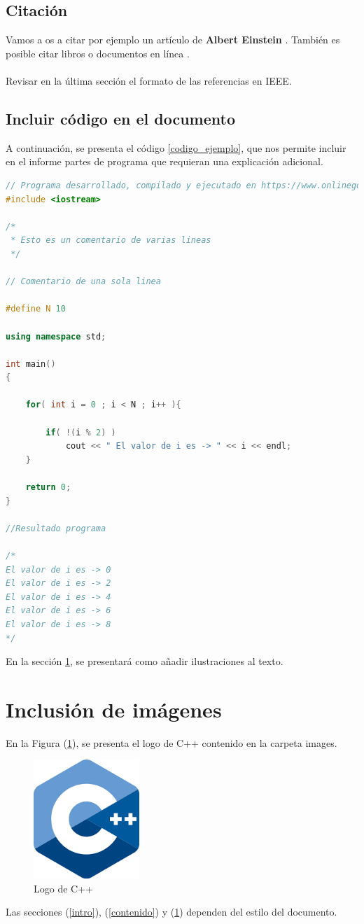 \documentclass{article}
\begin{document}
\subsection{Citación}
Vamos a os a citar por ejemplo un artículo de \textbf{Albert Einstein} \cite{einstein}.
También es posible citar libros \cite{dirac} o documentos en línea \cite{knuthwebsite}.\\\\
Revisar en la última sección el formato de las referencias en IEEE.

\subsection{Incluir código en el documento}
%
A continuación, se presenta el código \ref{codigo_ejemplo}, que nos permite incluir en el informe partes de programa que requieran una explicación adicional.
\begin{lstlisting}[language=C++, label=codigo_ejemplo]
// Programa desarrollado, compilado y ejecutado en https://www.onlinegdb.com
#include <iostream>

/*
 * Esto es un comentario de varias lineas
 */

// Comentario de una sola linea

#define N 10

using namespace std;

int main()
{
    
    for( int i = 0 ; i < N ; i++ ){
        
        if( !(i % 2) )
            cout << " El valor de i es -> " << i << endl;
    }
    
    return 0;
}

//Resultado programa

/*
El valor de i es -> 0
El valor de i es -> 2
El valor de i es -> 4
El valor de i es -> 6
El valor de i es -> 8
*/
\end{lstlisting}
En la sección \ref{imagenes}, se presentará como añadir ilustraciones al texto.


\section{Inclusión de imágenes} \label{imagenes}

En la Figura (\ref{fig:cpplogo}), se presenta el logo de C++ contenido en la carpeta images.

\begin{figure}[h]
\includegraphics[width=4cm]{cpplogo.png}
\centering
\caption{Logo de C++}
\label{fig:cpplogo}
\end{figure}

Las secciones (\ref{intro}), (\ref{contenido}) y (\ref{imagenes}) dependen del estilo del documento.



\end{document}
